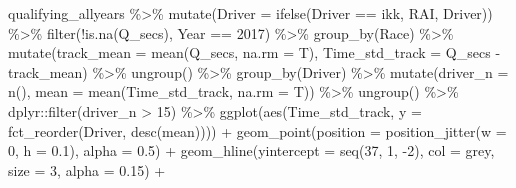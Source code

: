 \documentclass[
]{book}
\newenvironment{Shaded}{\begin{snugshade}}{\end{snugshade}}
\newcommand{\AttributeTok}[1]{\textcolor[rgb]{0.77,0.63,0.00}{#1}}
\newcommand{\DecValTok}[1]{\textcolor[rgb]{0.00,0.00,0.81}{#1}}
\newcommand{\FloatTok}[1]{\textcolor[rgb]{0.00,0.00,0.81}{#1}}
\newcommand{\FunctionTok}[1]{\textcolor[rgb]{0.00,0.00,0.00}{#1}}
\newcommand{\NormalTok}[1]{#1}
\newcommand{\SpecialCharTok}[1]{\textcolor[rgb]{0.00,0.00,0.00}{#1}}
\newcommand{\StringTok}[1]{\textcolor[rgb]{0.31,0.60,0.02}{#1}}
\begin{document}
\begin{Shaded}
\begin{Highlighting}[]
\NormalTok{qualifying\_allyears }\SpecialCharTok{\%\textgreater{}\%}
  \FunctionTok{mutate}\NormalTok{(}\AttributeTok{Driver =} \FunctionTok{ifelse}\NormalTok{(Driver }\SpecialCharTok{==} \StringTok{\textquotesingle{}ikk\textquotesingle{}}\NormalTok{, }\StringTok{\textquotesingle{}RAI\textquotesingle{}}\NormalTok{, Driver)) }\SpecialCharTok{\%\textgreater{}\%} 
  \FunctionTok{filter}\NormalTok{(}\SpecialCharTok{!}\FunctionTok{is.na}\NormalTok{(Q\_secs),}
\NormalTok{         Year }\SpecialCharTok{==} \DecValTok{2017}\NormalTok{) }\SpecialCharTok{\%\textgreater{}\%}
  \FunctionTok{group\_by}\NormalTok{(Race) }\SpecialCharTok{\%\textgreater{}\%}
  \FunctionTok{mutate}\NormalTok{(}\AttributeTok{track\_mean =} \FunctionTok{mean}\NormalTok{(Q\_secs, }\AttributeTok{na.rm =}\NormalTok{ T),}
         \AttributeTok{Time\_std\_track =}\NormalTok{ Q\_secs }\SpecialCharTok{{-}}\NormalTok{ track\_mean) }\SpecialCharTok{\%\textgreater{}\%} 
  \FunctionTok{ungroup}\NormalTok{() }\SpecialCharTok{\%\textgreater{}\%} 
  \FunctionTok{group\_by}\NormalTok{(Driver) }\SpecialCharTok{\%\textgreater{}\%} 
  \FunctionTok{mutate}\NormalTok{(}\AttributeTok{driver\_n =} \FunctionTok{n}\NormalTok{(),}
         \AttributeTok{mean =} \FunctionTok{mean}\NormalTok{(Time\_std\_track, }\AttributeTok{na.rm =}\NormalTok{ T)) }\SpecialCharTok{\%\textgreater{}\%}
  \FunctionTok{ungroup}\NormalTok{() }\SpecialCharTok{\%\textgreater{}\%}
\NormalTok{  dplyr}\SpecialCharTok{::}\FunctionTok{filter}\NormalTok{(driver\_n }\SpecialCharTok{\textgreater{}} \DecValTok{15}\NormalTok{) }\SpecialCharTok{\%\textgreater{}\%} 
  \FunctionTok{ggplot}\NormalTok{(}\FunctionTok{aes}\NormalTok{(Time\_std\_track, }\AttributeTok{y =} \FunctionTok{fct\_reorder}\NormalTok{(Driver, }\FunctionTok{desc}\NormalTok{(mean)))) }\SpecialCharTok{+}
  \FunctionTok{geom\_point}\NormalTok{(}\AttributeTok{position =} \FunctionTok{position\_jitter}\NormalTok{(}\AttributeTok{w =} \DecValTok{0}\NormalTok{, }\AttributeTok{h =} \FloatTok{0.1}\NormalTok{), }\AttributeTok{alpha =} \FloatTok{0.5}\NormalTok{) }\SpecialCharTok{+}
  \FunctionTok{geom\_hline}\NormalTok{(}\AttributeTok{yintercept =} \FunctionTok{seq}\NormalTok{(}\DecValTok{37}\NormalTok{, }\DecValTok{1}\NormalTok{, }\SpecialCharTok{{-}}\DecValTok{2}\NormalTok{), }\AttributeTok{col =} \StringTok{\textquotesingle{}grey\textquotesingle{}}\NormalTok{, }\AttributeTok{size =} \DecValTok{3}\NormalTok{, }\AttributeTok{alpha =} \FloatTok{0.15}\NormalTok{) }\SpecialCharTok{+}

\end{Highlighting}
\end{Shaded}
\end{document}
